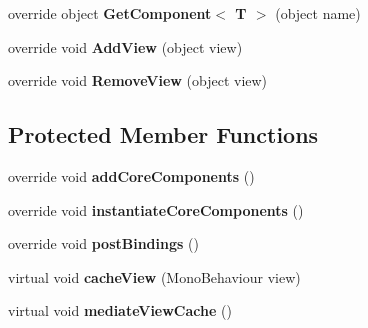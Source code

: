 \begin{DoxyCompactItemize}
\item 
\hypertarget{classbabel_1_1extensions_1_1context_1_1impl_1_1_m_v_c_s_context_a4a121fc78ff36e782eca277fb4b91cb2}{override object {\bfseries Get\-Component$<$ T $>$} (object name)}\label{classbabel_1_1extensions_1_1context_1_1impl_1_1_m_v_c_s_context_a4a121fc78ff36e782eca277fb4b91cb2}

\item 
\hypertarget{classbabel_1_1extensions_1_1context_1_1impl_1_1_m_v_c_s_context_a1751dd4cf801d94447bf5a202be0376d}{override void {\bfseries Add\-View} (object view)}\label{classbabel_1_1extensions_1_1context_1_1impl_1_1_m_v_c_s_context_a1751dd4cf801d94447bf5a202be0376d}

\item 
\hypertarget{classbabel_1_1extensions_1_1context_1_1impl_1_1_m_v_c_s_context_a47c9dbf02962f1e9d5d4da39e292ce9f}{override void {\bfseries Remove\-View} (object view)}\label{classbabel_1_1extensions_1_1context_1_1impl_1_1_m_v_c_s_context_a47c9dbf02962f1e9d5d4da39e292ce9f}

\end{DoxyCompactItemize}
\subsection*{Protected Member Functions}
\begin{DoxyCompactItemize}
\item 
\hypertarget{classbabel_1_1extensions_1_1context_1_1impl_1_1_m_v_c_s_context_a248b38344713472e2a0d585b088e3351}{override void {\bfseries add\-Core\-Components} ()}\label{classbabel_1_1extensions_1_1context_1_1impl_1_1_m_v_c_s_context_a248b38344713472e2a0d585b088e3351}

\item 
\hypertarget{classbabel_1_1extensions_1_1context_1_1impl_1_1_m_v_c_s_context_a54737512037185b17ccab6089b5a59da}{override void {\bfseries instantiate\-Core\-Components} ()}\label{classbabel_1_1extensions_1_1context_1_1impl_1_1_m_v_c_s_context_a54737512037185b17ccab6089b5a59da}

\item 
\hypertarget{classbabel_1_1extensions_1_1context_1_1impl_1_1_m_v_c_s_context_a90ffc50e9a8be0e9129027a1dde8ecb2}{override void {\bfseries post\-Bindings} ()}\label{classbabel_1_1extensions_1_1context_1_1impl_1_1_m_v_c_s_context_a90ffc50e9a8be0e9129027a1dde8ecb2}

\item 
\hypertarget{classbabel_1_1extensions_1_1context_1_1impl_1_1_m_v_c_s_context_ac5e5fea641380a19f11ac7351349cc41}{virtual void {\bfseries cache\-View} (Mono\-Behaviour view)}\label{classbabel_1_1extensions_1_1context_1_1impl_1_1_m_v_c_s_context_ac5e5fea641380a19f11ac7351349cc41}

\item 
\hypertarget{classbabel_1_1extensions_1_1context_1_1impl_1_1_m_v_c_s_context_a764f6121bcbce608a91a3eed827b1166}{virtual void {\bfseries mediate\-View\-Cache} ()}\label{classbabel_1_1extensions_1_1context_1_1impl_1_1_m_v_c_s_context_a764f6121bcbce608a91a3eed827b1166}

\end{DoxyCompactItemize}
